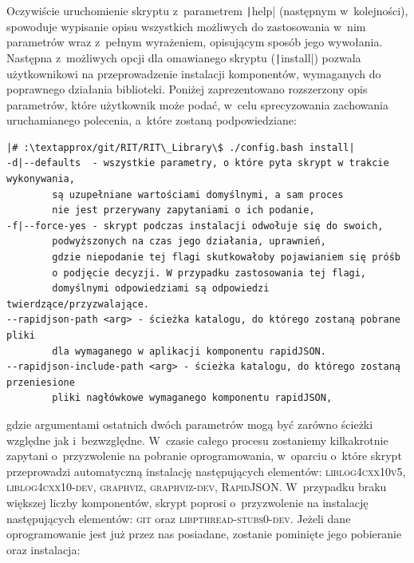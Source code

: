 Oczywiście uruchomienie skryptu z~parametrem \texttt|help| (następnym w~kolejności), spowoduje wypisanie opisu wszystkich możliwych do zastosowania w~nim parametrów wraz z~pełnym wyrażeniem, opisującym sposób jego wywołania.
Następna z~możliwych opcji dla omawianego skryptu (\texttt|install|) pozwala użytkownikowi na przeprowadzenie instalacji komponentów, wymaganych do poprawnego działania biblioteki.
Poniżej zaprezentowano rozszerzony opis parametrów, które użytkownik może podać, w~celu sprecyzowania zachowania uruchamianego polecenia, a~które zostaną podpowiedziane:
\begin{verbatim}
|# :\textapprox/git/RIT/RIT\_Library\$ ./config.bash install|
-d|--defaults  - wszystkie parametry, o które pyta skrypt w trakcie wykonywania, 
		są uzupełniane wartościami domyślnymi, a sam proces 
		nie jest przerywany zapytaniami o ich podanie,
-f|--force-yes - skrypt podczas instalacji odwołuje się do swoich, 
		podwyższonych na czas jego działania, uprawnień, 
		gdzie niepodanie tej flagi skutkowałoby pojawianiem się próśb 
		o podjęcie decyzji. W przypadku zastosowania tej flagi, 
		domyślnymi odpowiedziami są odpowiedzi twierdzące/przyzwalające.
--rapidjson-path <arg> - ścieżka katalogu, do którego zostaną pobrane pliki 
		dla wymaganego w aplikacji komponentu rapidJSON.
--rapidjson-include-path <arg> - ścieżka katalogu, do którego zostaną przeniesione 
		pliki nagłówkowe wymaganego komponentu rapidJSON,
\end{verbatim}
gdzie argumentami ostatnich dwóch parametrów mogą być zarówno ścieżki względne jak i~bezwzględne.
W~czasie całego procesu zostaniemy kilkakrotnie zapytani o~przyzwolenie na pobranie oprogramowania, w~oparciu o~które skrypt przeprowadzi automatyczną instalację następujących elementów: \textsc{liblog4cxx10v5}, \textsc{liblog4cxx10-dev}, \textsc{graphviz}, \textsc{graphviz-dev}, \textsc{RapidJSON}.
W~przypadku braku większej liczby komponentów, skrypt poprosi o~przyzwolenie na instalację następujących elementów: \textsc{git} oraz \textsc{libpthread-stubs0-dev}.
Jeżeli dane oprogramowanie jest już przez nas posiadane, zostanie pominięte jego pobieranie oraz instalacja:

